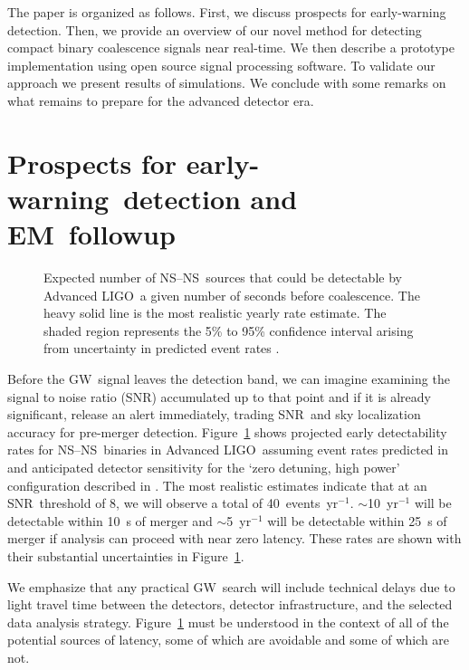 \documentclass[preprint2]{aastex}
\newcommand{\earlywarning}{early-warning}
\newcommand{\NS}{NS}
\newcommand{\GW}{GW}%
\newcommand{\EM}{EM}%
\newcommand{\LIGO}{LIGO}%
\newcommand{\SNR}{SNR}%
\begin{document}
The paper is organized as follows.  First, we discuss prospects for early-warning
detection.  Then, we provide an overview of our novel method for detecting compact
binary coalescence signals near real-time. We then describe a prototype
implementation using open source signal processing software.  To validate our approach
we present results of simulations.  We conclude with some remarks on what remains to
prepare for the advanced detector era.

\section{Prospects for \earlywarning\ detection and \EM\ followup}

\begin{figure}[h]
\caption{\label{fig:earlywarning}Expected number of \NS--\NS\
sources that could be detectable by Advanced \LIGO\ a given number of seconds
before coalescence.  The heavy solid line is the most realistic yearly rate
estimate.  The shaded region represents the 5\% to 95\% confidence interval
arising from uncertainty in predicted event rates \citep{Abadie:2010p10836}.}
\end{figure}
%
Before the \GW\ signal leaves the detection band, we can imagine examining the
signal to noise ratio (\SNR) accumulated up to that point and if it is
already significant, release an alert immediately, trading \SNR\ and sky
localization accuracy for pre-merger detection.
Figure~\ref{fig:earlywarning} shows projected early detectability rates for
\NS--\NS\ binaries in Advanced \LIGO\ assuming event rates
predicted in \citet{Abadie:2010p10836} and anticipated detector sensitivity for
the `zero detuning, high power' configuration described in \citet{ALIGONoise}.
The most realistic estimates indicate that at an \SNR\ threshold of 8, we will
observe a total of 40~events~yr$^{-1}$. $\sim$10~yr$^{-1}$ will be detectable
within 10~s of merger and $\sim$5~yr$^{-1}$ will be detectable within 25~s of
merger if analysis can proceed with near zero latency. These rates are shown
with their substantial uncertainties in Figure~\ref{fig:earlywarning}.

We emphasize that any practical \GW\ search will include technical delays due
to light travel time between the detectors, detector infrastructure, and the
selected data analysis strategy.  Figure~\ref{fig:earlywarning} must be understood
in the context of all of the potential sources of latency, some of which are avoidable
and some of which are not. 
\end{document}
